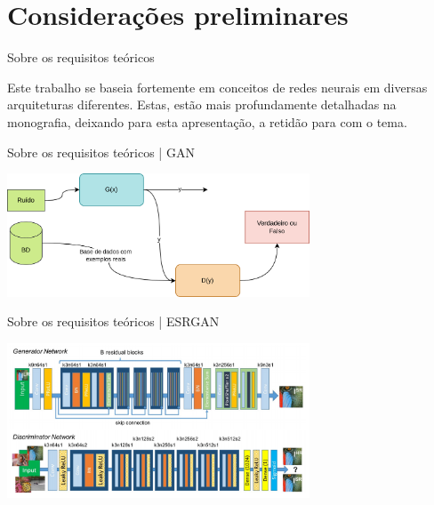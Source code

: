 \documentclass{beamer}
\begin{document}
    \section{Considerações preliminares}

    \begin{frame}{Sobre os requisitos teóricos}{\thesection \, \secname}

        Este trabalho se baseia fortemente em conceitos de redes neurais em diversas arquiteturas diferentes. Estas, estão mais profundamente detalhadas na monografia, deixando para esta apresentação, a retidão para com o tema.
        
    \end{frame}

    \begin{frame}{Sobre os requisitos teóricos | GAN}{\thesection \, \secname}

        \centering
        \includegraphics[width=9cm]{img/GAN_2.png} \\
        \label{fig:gan}
        
    \end{frame}

    \begin{frame}{Sobre os requisitos teóricos | ESRGAN}{\thesection \, \secname}

        \centering
        \includegraphics[width=9cm]{img/SRGAN.png}\\
        
    \end{frame}
\end{document}
